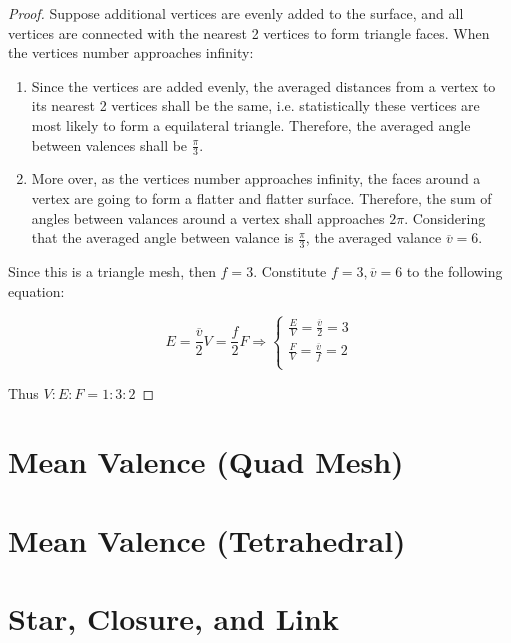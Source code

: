 \begin{proof}
    Suppose additional vertices are evenly added to the surface, and all vertices are connected with the nearest 2 vertices to form triangle faces. When the vertices number approaches infinity:

    \begin{enumerate}
        \item Since the vertices are added evenly, the averaged distances from a vertex to its nearest 2 vertices shall be the same, i.e. statistically these vertices are most likely to form a equilateral triangle. Therefore, the averaged angle between valences shall be $\frac{\pi}{3}$.
        \item More over, as the vertices number approaches infinity, the faces around a vertex are going to form a flatter and flatter surface. Therefore, the sum of angles between valances around a vertex shall approaches $2\pi$. Considering that the averaged angle between valance is $\frac{\pi}{3}$, the averaged valance $\overline{v} = 6$.
    \end{enumerate}

    Since this is a triangle mesh, then $f = 3$. Constitute $f = 3, \overline{v} = 6$ to the following equation:

    \begin{equation}
        E = \frac{\overline{v}}{2} V = \frac{f}{2} F
        \Rightarrow \begin{cases}
            \frac{E}{V} = \frac{\overline{v}}{2} = 3\\
            \frac{F}{V} = \frac{\overline{v}}{f} = 2\\
        \end{cases}
    \end{equation}

    Thus $V:E:F = 1:3:2$
\end{proof}

\section{Mean Valence (Quad Mesh)}

\section{Mean Valence (Tetrahedral)}

\section{Star, Closure, and Link}


